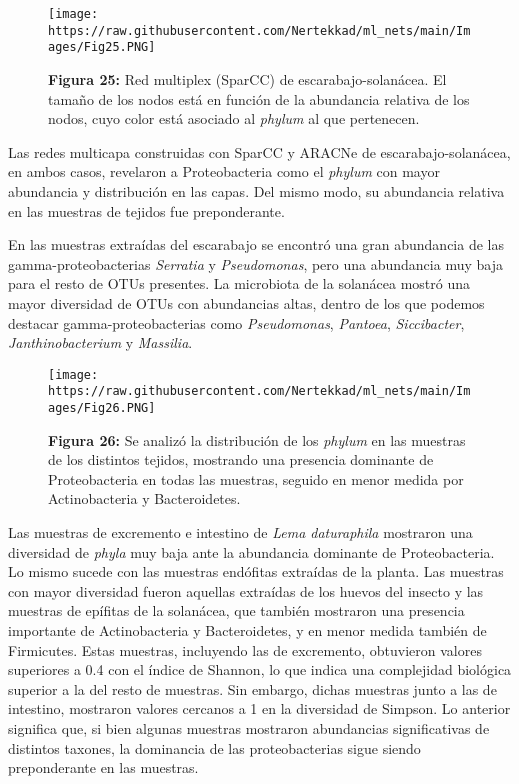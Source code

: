 \documentclass[
]{book}
\begin{document}
\begin{figure}
\centering
\texttt{[image: https://raw.githubusercontent.com/Nertekkad/ml\_nets/main/Images/Fig25.PNG]}
\caption{\textbf{Figura 25:} Red multiplex (SparCC) de escarabajo-solanácea. El tamaño de los nodos está en función de la abundancia relativa de los nodos, cuyo color está asociado al \emph{phylum} al que pertenecen.}
\end{figure}

Las redes multicapa construidas con SparCC y ARACNe de escarabajo-solanácea, en ambos casos, revelaron a Proteobacteria como el \emph{phylum} con mayor abundancia y distribución en las capas. Del mismo modo, su abundancia relativa en las muestras de tejidos fue preponderante.

En las muestras extraídas del escarabajo se encontró una gran abundancia de las gamma-proteobacterias \emph{Serratia} y \emph{Pseudomonas}, pero una abundancia muy baja para el resto de OTUs presentes. La microbiota de la solanácea mostró una mayor diversidad de OTUs con abundancias altas, dentro de los que podemos destacar gamma-proteobacterias como \emph{Pseudomonas}, \emph{Pantoea}, \emph{Siccibacter}, \emph{Janthinobacterium} y \emph{Massilia}.

\begin{figure}
\centering
\texttt{[image: https://raw.githubusercontent.com/Nertekkad/ml\_nets/main/Images/Fig26.PNG]}
\caption{\textbf{Figura 26:} Se analizó la distribución de los \emph{phylum} en las muestras de los distintos tejidos, mostrando una presencia dominante de Proteobacteria en todas las muestras, seguido en menor medida por Actinobacteria y Bacteroidetes.}
\end{figure}

Las muestras de excremento e intestino de \emph{Lema daturaphila} mostraron una diversidad de \emph{phyla} muy baja ante la abundancia dominante de Proteobacteria. Lo mismo sucede con las muestras endófitas extraídas de la planta. Las muestras con mayor diversidad fueron aquellas extraídas de los huevos del insecto y las muestras de epífitas de la solanácea, que también mostraron una presencia importante de Actinobacteria y Bacteroidetes, y en menor medida también de Firmicutes. Estas muestras, incluyendo las de excremento, obtuvieron valores superiores a 0.4 con el índice de Shannon, lo que indica una complejidad biológica superior a la del resto de muestras. Sin embargo, dichas muestras junto a las de intestino, mostraron valores cercanos a 1 en la diversidad de Simpson. Lo anterior significa que, si bien algunas muestras mostraron abundancias significativas de distintos taxones, la dominancia de las proteobacterias sigue siendo preponderante en las muestras.
\end{document}
